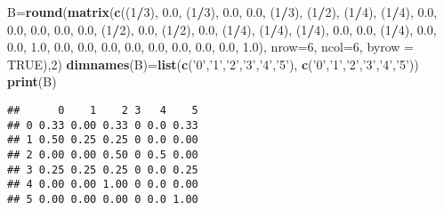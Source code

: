 \documentclass[]{article}
\newenvironment{Shaded}{\begin{snugshade}}{\end{snugshade}}
\newcommand{\DataTypeTok}[1]{\textcolor[rgb]{0.13,0.29,0.53}{#1}}
\newcommand{\DecValTok}[1]{\textcolor[rgb]{0.00,0.00,0.81}{#1}}
\newcommand{\FloatTok}[1]{\textcolor[rgb]{0.00,0.00,0.81}{#1}}
\newcommand{\KeywordTok}[1]{\textcolor[rgb]{0.13,0.29,0.53}{\textbf{#1}}}
\newcommand{\NormalTok}[1]{#1}
\newcommand{\OperatorTok}[1]{\textcolor[rgb]{0.81,0.36,0.00}{\textbf{#1}}}
\newcommand{\OtherTok}[1]{\textcolor[rgb]{0.56,0.35,0.01}{#1}}
\newcommand{\StringTok}[1]{\textcolor[rgb]{0.31,0.60,0.02}{#1}}
\begin{document}
\begin{Shaded}
\begin{Highlighting}[]
\NormalTok{B=}\KeywordTok{round}\NormalTok{(}\KeywordTok{matrix}\NormalTok{(}\KeywordTok{c}\NormalTok{((}\DecValTok{1}\OperatorTok{/}\DecValTok{3}\NormalTok{), }\FloatTok{0.0}\NormalTok{, (}\DecValTok{1}\OperatorTok{/}\DecValTok{3}\NormalTok{), }\FloatTok{0.0}\NormalTok{, }\FloatTok{0.0}\NormalTok{, (}\DecValTok{1}\OperatorTok{/}\DecValTok{3}\NormalTok{), }
\NormalTok{           (}\DecValTok{1}\OperatorTok{/}\DecValTok{2}\NormalTok{), (}\DecValTok{1}\OperatorTok{/}\DecValTok{4}\NormalTok{), (}\DecValTok{1}\OperatorTok{/}\DecValTok{4}\NormalTok{), }\FloatTok{0.0}\NormalTok{, }\FloatTok{0.0}\NormalTok{, }\FloatTok{0.0}\NormalTok{, }
           \FloatTok{0.0}\NormalTok{, }\FloatTok{0.0}\NormalTok{, (}\DecValTok{1}\OperatorTok{/}\DecValTok{2}\NormalTok{), }\FloatTok{0.0}\NormalTok{, (}\DecValTok{1}\OperatorTok{/}\DecValTok{2}\NormalTok{), }\FloatTok{0.0}\NormalTok{,}
\NormalTok{           (}\DecValTok{1}\OperatorTok{/}\DecValTok{4}\NormalTok{), (}\DecValTok{1}\OperatorTok{/}\DecValTok{4}\NormalTok{), (}\DecValTok{1}\OperatorTok{/}\DecValTok{4}\NormalTok{), }\FloatTok{0.0}\NormalTok{, }\FloatTok{0.0}\NormalTok{, (}\DecValTok{1}\OperatorTok{/}\DecValTok{4}\NormalTok{),}
           \FloatTok{0.0}\NormalTok{, }\FloatTok{0.0}\NormalTok{, }\FloatTok{1.0}\NormalTok{, }\FloatTok{0.0}\NormalTok{, }\FloatTok{0.0}\NormalTok{, }\FloatTok{0.0}\NormalTok{, }
           \FloatTok{0.0}\NormalTok{, }\FloatTok{0.0}\NormalTok{, }\FloatTok{0.0}\NormalTok{, }\FloatTok{0.0}\NormalTok{, }\FloatTok{0.0}\NormalTok{, }\FloatTok{1.0}\NormalTok{), }\DataTypeTok{nrow=}\DecValTok{6}\NormalTok{, }\DataTypeTok{ncol=}\DecValTok{6}\NormalTok{, }\DataTypeTok{byrow =} \OtherTok{TRUE}\NormalTok{),}\DecValTok{2}\NormalTok{)}
\KeywordTok{dimnames}\NormalTok{(B)=}\KeywordTok{list}\NormalTok{(}\KeywordTok{c}\NormalTok{(}\StringTok{'0'}\NormalTok{,}\StringTok{'1'}\NormalTok{,}\StringTok{'2'}\NormalTok{,}\StringTok{'3'}\NormalTok{,}\StringTok{'4'}\NormalTok{,}\StringTok{'5'}\NormalTok{), }\KeywordTok{c}\NormalTok{(}\StringTok{'0'}\NormalTok{,}\StringTok{'1'}\NormalTok{,}\StringTok{'2'}\NormalTok{,}\StringTok{'3'}\NormalTok{,}\StringTok{'4'}\NormalTok{,}\StringTok{'5'}\NormalTok{))}
\KeywordTok{print}\NormalTok{(B)}
\end{Highlighting}
\end{Shaded}

\begin{verbatim}
##      0    1    2 3   4    5
## 0 0.33 0.00 0.33 0 0.0 0.33
## 1 0.50 0.25 0.25 0 0.0 0.00
## 2 0.00 0.00 0.50 0 0.5 0.00
## 3 0.25 0.25 0.25 0 0.0 0.25
## 4 0.00 0.00 1.00 0 0.0 0.00
## 5 0.00 0.00 0.00 0 0.0 1.00
\end{verbatim}
\end{document}
